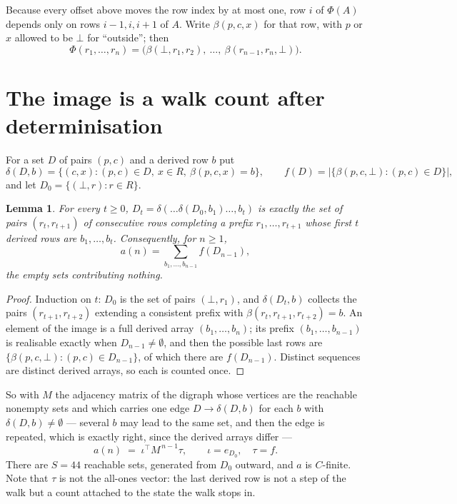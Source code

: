 \documentclass[11pt,a4paper]{article}
\theoremstyle{plain}
\newtheorem{lemma}[theorem]{Lemma}
\theoremstyle{definition}
\begin{document}
Because every offset above moves the row index by at most one, row $i$ of
$\Phi(A)$ depends only on rows $i-1,i,i+1$ of $A$. Write $\beta(p,c,x)$ for that row, with $p$
or $x$ allowed to be $\bot$ for ``outside''; then
\[
\Phi(r_1,\dots,r_n)=\bigl(\beta(\bot,r_1,r_2),\ \dots,\ \beta(r_{n-1},r_n,\bot)\bigr).
\]

\section{The image is a walk count after determinisation}

For a set $D$ of pairs $(p,c)$ and a derived row $b$ put
\[
\delta(D,b)=\{(c,x):(p,c)\in D,\ x\in R,\ \beta(p,c,x)=b\},\qquad
f(D)=\bigl|\{\beta(p,c,\bot):(p,c)\in D\}\bigr| ,
\]
and let $D_0=\{(\bot,r):r\in R\}$.

\begin{lemma}\label{lem:det}
For every $t\ge0$, $D_t=\delta(\dots\delta(D_0,b_1)\dots,b_t)$ is exactly the set of pairs
$(r_t,r_{t+1})$ of consecutive rows completing a prefix $r_1,\dots,r_{t+1}$ whose first $t$
derived rows are $b_1,\dots,b_t$. Consequently, for $n\ge1$,
\[
a(n)=\sum_{b_1,\dots,b_{n-1}}f(D_{n-1}),
\]
the empty sets contributing nothing.
\end{lemma}

\begin{proof}
Induction on $t$: $D_0$ is the set of pairs $(\bot,r_1)$, and $\delta(D_t,b)$ collects the
pairs $(r_{t+1},r_{t+2})$ extending a consistent prefix with
$\beta(r_t,r_{t+1},r_{t+2})=b$. An element of the image is a full derived array
$(b_1,\dots,b_n)$; its prefix $(b_1,\dots,b_{n-1})$ is realisable exactly when
$D_{n-1}\neq\emptyset$, and then the possible last rows are
$\{\beta(p,c,\bot):(p,c)\in D_{n-1}\}$, of which there are $f(D_{n-1})$. Distinct sequences
are distinct derived arrays, so each is counted once.
\end{proof}

So with $M$ the adjacency matrix of the digraph whose vertices are the reachable nonempty sets
and which carries one edge $D\to\delta(D,b)$ for each $b$ with $\delta(D,b)\neq\emptyset$ ---
several $b$ may lead to the same set, and then the edge is repeated, which is exactly right,
since the derived arrays differ ---
\[
a(n)\;=\;\iota^{\!\top}M^{\,n-1}\tau,\qquad \iota=e_{D_0},\quad \tau=f .
\]
There are $S=44$ reachable sets, generated from $D_0$ outward, and $a$ is $C$-finite.
Note that $\tau$ is not the all-ones vector: the last derived row is not a
step of the walk but a count attached to the state the walk stops in.
\end{document}
